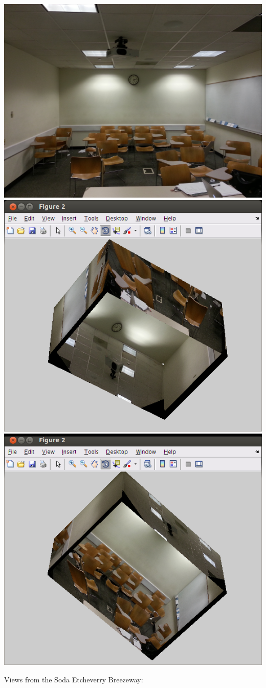 \documentclass[11pt]{article}
\begin{document}
\begin{enumerate}
    \includegraphics[width=0.5\linewidth]{./../img/TIP_1.jpg}
    \includegraphics[width=0.5\linewidth]{./../img/TIP_1_ceiling.png}
    \includegraphics[width=0.5\linewidth]{./../img/TIP_1_whiteboard.png}

    Views from the Soda Etcheverry Breezeway:


\end{enumerate}
\end{document}
